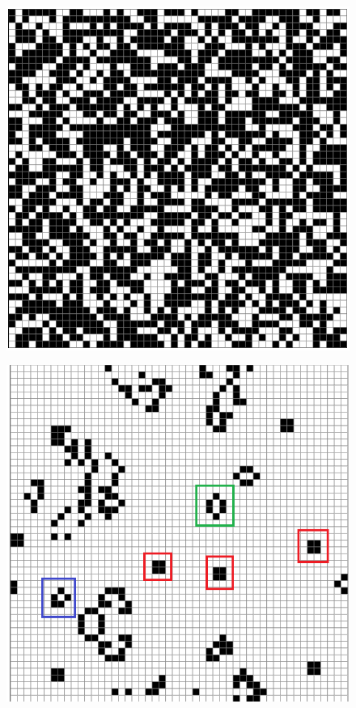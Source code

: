 \documentclass[12pt] {article}
\begin{document}
\begin{figure}[H]
    \begin{minipage}[t]{.3\textwidth}
        \centering
        \includegraphics[width=\textwidth]{res/23_3_first.png}
        \label{fig:life1}
    \end{minipage}
    \hfill
    \begin{minipage}[t]{.3\textwidth}
        \centering
        \includegraphics[width=\textwidth]{res/23_3_470.png}

\end{minipage}
\end{figure}
\end{document}
